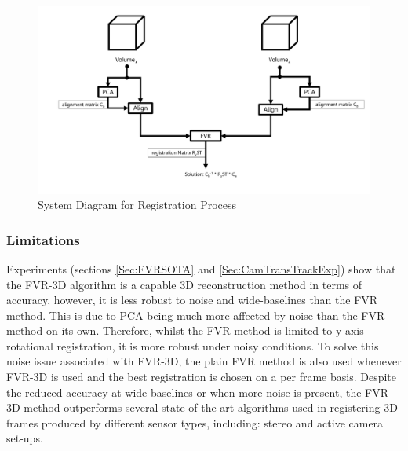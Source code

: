 \begin{figure}[!htb]
\centering
\includegraphics[width=6.0in]{images/methodology/FVR/pipeline8}
\caption{System Diagram for Registration Process}
\label{fig:PIPELINE8}
\end{figure}


\subsubsection{Limitations}

Experiments (sections \ref{Sec:FVRSOTA} and \ref{Sec:CamTransTrackExp}) show that the FVR-3D algorithm is a capable 3D reconstruction method in terms of accuracy, however, it is less robust to noise and wide-baselines than the FVR method. This is due to PCA being much more affected by noise than the FVR method on its own. Therefore, whilst the FVR method is limited to y-axis rotational registration, it is more robust under noisy conditions. To solve this noise issue associated with FVR-3D, the plain FVR method is also used whenever FVR-3D is used and the best registration is chosen on a per frame basis. Despite the reduced accuracy at wide baselines or when more noise is present, the FVR-3D method outperforms several state-of-the-art algorithms used in registering 3D frames produced by different sensor types, including: stereo and active camera set-ups. \\




